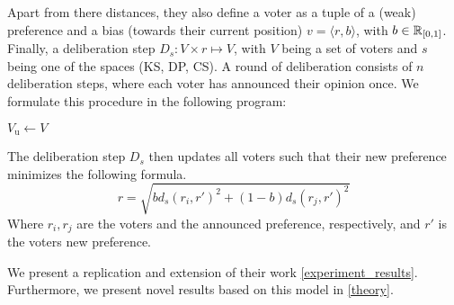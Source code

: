 Apart from there distances, they also define a voter as a tuple of a (weak) preference and a bias (towards their current position) \(v = \langle r, b \rangle \), with \( b \in \mathbb{R}_{[0,1]}\). Finally, a deliberation step \(D_{s} : V \times r \mapsto V\), with $V$ being a set of voters and $s$ being one of the spaces (KS, DP, CS). A round of deliberation consists of $n$ deliberation steps, where each voter has announced their opinion once. We formulate this procedure in the following program:
\IncMargin{1em}
\begin{algorithm}

	\BlankLine

	$V_{\text{u}} \gets V$ \\


\end{algorithm}
\DecMargin{1em}

The deliberation step $D_s$ then updates all voters such that their new preference  minimizes the following formula.
\begin{equation}
	r =
	\sqrt{
		b d_s(r_i, r')^2 + (1-b)d_s(r_j, r')^2
	}
	\label{eq:deliberation_step_formula}
\end{equation}
Where $r_i, r_j$ are the voters and the announced preference, respectively, and $r'$ is the voters new preference.

We present a replication and extension of their work \cref{experiment_results}. Furthermore, we present novel results based on this model in \cref{theory}.

